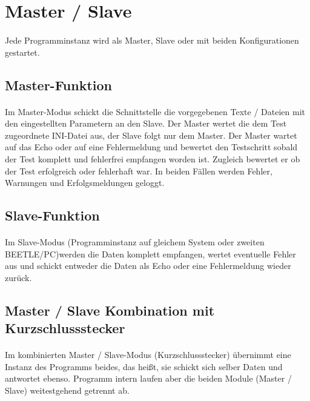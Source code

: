 \section{Master / Slave}
\paragraph{}
Jede Programminstanz wird als Master, Slave oder mit beiden Konfigurationen gestartet.


\subsection{Master-Funktion}
\paragraph{}
Im Master-Modus schickt die Schnittstelle die vorgegebenen Texte / Dateien mit den eingestellten Parametern an den Slave. Der Master wertet die dem Test zugeordnete INI-Datei aus, der Slave folgt nur dem Master. Der Master wartet auf das Echo oder auf eine Fehlermeldung und bewertet den Testschritt sobald der Test komplett und fehlerfrei empfangen worden ist. Zugleich bewertet er ob der Test erfolgreich oder fehlerhaft war. In beiden Fällen werden Fehler, Warnungen und Erfolgsmeldungen geloggt.


\subsection{Slave-Funktion}
\paragraph{}
Im Slave-Modus (Programminstanz auf gleichem System oder zweiten BEETLE/PC)werden die Daten komplett empfangen, wertet eventuelle Fehler aus und schickt entweder die Daten als Echo oder eine Fehlermeldung wieder zurück. 

\subsection{Master / Slave Kombination mit Kurzschlussstecker}
\paragraph{}
Im kombinierten Master / Slave-Modus (Kurzschlussstecker) übernimmt eine Instanz des Programms beides, das heißt, sie schickt sich selber Daten und antwortet ebenso. Programm intern laufen aber die beiden Module (Master / Slave) weitestgehend getrennt ab.

